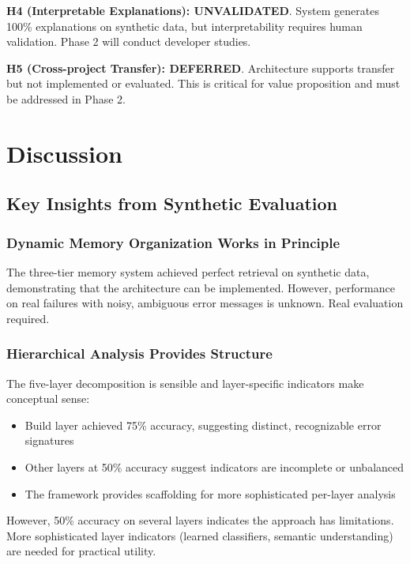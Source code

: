 \documentclass[11pt]{article}
\begin{document}
\textbf{H4 (Interpretable Explanations): UNVALIDATED}. System generates 100\% explanations on synthetic data, but interpretability requires human validation. Phase 2 will conduct developer studies.

\textbf{H5 (Cross-project Transfer): DEFERRED}. Architecture supports transfer but not implemented or evaluated. This is critical for value proposition and must be addressed in Phase 2.

\section{Discussion}

\subsection{Key Insights from Synthetic Evaluation}

\subsubsection{Dynamic Memory Organization Works in Principle}

The three-tier memory system achieved perfect retrieval on synthetic data, demonstrating that the architecture can be implemented. However, performance on real failures with noisy, ambiguous error messages is unknown. Real evaluation required.

\subsubsection{Hierarchical Analysis Provides Structure}

The five-layer decomposition is sensible and layer-specific indicators make conceptual sense:

\begin{itemize}
    \item Build layer achieved 75\% accuracy, suggesting distinct, recognizable error signatures
    \item Other layers at 50\% accuracy suggest indicators are incomplete or unbalanced
    \item The framework provides scaffolding for more sophisticated per-layer analysis
\end{itemize}

However, 50\% accuracy on several layers indicates the approach has limitations. More sophisticated layer indicators (learned classifiers, semantic understanding) are needed for practical utility.
\end{document}
